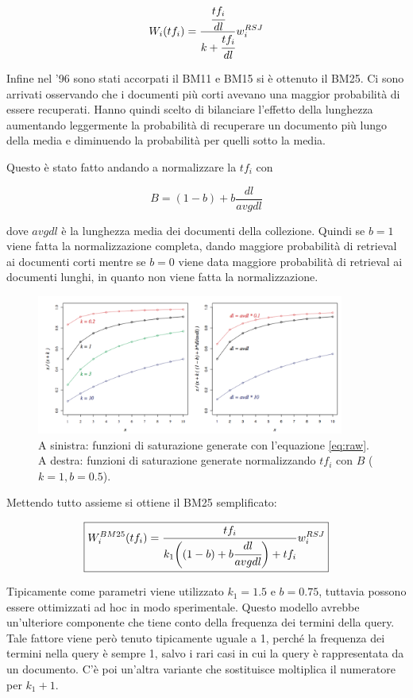 $$
W_i(tf_i) = \frac{\cfrac{tf_i}{dl}}{k + \cfrac{tf_i}{dl}}  w_i^{RSJ}
$$

Infine nel '96 sono stati accorpati il BM11 e BM15 si è ottenuto il BM25. Ci sono arrivati osservando che i documenti più corti avevano una maggior probabilità di essere recuperati. 
Hanno quindi scelto di bilanciare l'effetto della lunghezza aumentando leggermente la probabilità di recuperare un documento più lungo della media e diminuendo la probabilità per quelli sotto la media.

Questo è stato fatto andando a normalizzare la $tf_i$ con

$$
B = (1-b)+ b\frac{dl}{avgdl}
$$

\noindent dove $avgdl$ è la lunghezza media dei documenti della collezione.
Quindi se $b=1$ viene fatta la normalizzazione completa, dando maggiore probabilità di retrieval ai documenti corti mentre se $b=0$ viene data maggiore probabilità di retrieval ai documenti lunghi, in quanto non viene fatta la normalizzazione.

\begin{figure}[htbp]
	\centering
	\includegraphics[width=0.9\textwidth]{images/l19-fig-2.png}
	\caption{A sinistra: funzioni di saturazione generate con l'equazione \ref{eq:raw}. A destra: funzioni di saturazione generate normalizzando $tf_i$ con $B$ ($k=1, b=0.5$).}
\end{figure}


Mettendo tutto assieme si ottiene il BM25 semplificato: 

\begin{align}
\boxed{
	W_i^{BM25}(tf_i) = \frac{tf_i}{k_1\bigg((1-b)+ b\cfrac{dl}{avgdl}\bigg) + tf_i } w_i^{RSJ}
}
\end{align}

Tipicamente come parametri viene utilizzato $k_1=1.5$ e $b=0.75$, tuttavia possono essere ottimizzati ad hoc in modo sperimentale.
Questo modello avrebbe un'ulteriore componente che tiene conto della frequenza dei termini della query. Tale fattore viene però tenuto tipicamente uguale a 1, perché la frequenza dei termini nella query è sempre 1, salvo i rari casi in cui la query è rappresentata da un documento.
C'è poi un'altra variante che sostituisce moltiplica il numeratore per $k_1+1$.

